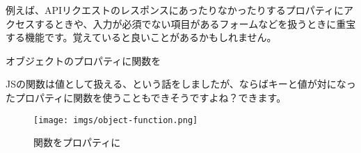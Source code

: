例えば、APIリクエストのレスポンスにあったりなかったりするプロパティにアクセスするときや、入力が必須でない項目があるフォームなどを扱うときに重宝する機能です。覚えていると良いことがあるかもしれません。

オブジェクトのプロパティに関数を

JSの関数は値として扱える、という話をしましたが、ならばキーと値が対になったプロパティに関数を使うこともできそうですよね？できます。

\begin{Shaded}
\begin{Highlighting}[]
  \OperatorTok{=}\NormalTok{ \{}
    \OperatorTok{:}\OperatorTok{,}\KeywordTok{=\textgreater{}}\OperatorTok{+}\OperatorTok{,}
    \OperatorTok{:}\OperatorTok{,}\KeywordTok{=\textgreater{}}\OperatorTok{{-}}\OperatorTok{,}
    \OperatorTok{:}\OperatorTok{,}\KeywordTok{=\textgreater{}}\OperatorTok{*}\OperatorTok{,}
    \OperatorTok{:}\OperatorTok{,}\KeywordTok{=\textgreater{}}\OperatorTok{/}
\NormalTok{  \}}\OperatorTok{;}

  \NormalTok{(}\OperatorTok{,} \NormalTok{))}\OperatorTok{;}
  \NormalTok{(}\OperatorTok{,} \NormalTok{))}\OperatorTok{;}
  \NormalTok{(}\OperatorTok{,} \NormalTok{))}\OperatorTok{;}
  \NormalTok{(}\OperatorTok{,} \NormalTok{))}\OperatorTok{;}
\end{Highlighting}
\end{Shaded}

\begin{figure}
\centering
\texttt{[image: imgs/object-function.png]}
\caption{関数をプロパティに}
\end{figure}

